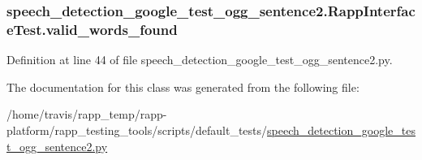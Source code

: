 \hypertarget{classspeech__detection__google__test__ogg__sentence2_1_1RappInterfaceTest_afa9a6449293346d27b73fc6e379cc70e}{
\subsubsection[{valid\-\_\-words\-\_\-found}]{\setlength{\rightskip}{0pt plus 5cm}speech\-\_\-detection\-\_\-google\-\_\-test\-\_\-ogg\-\_\-sentence2.\-Rapp\-Interface\-Test.\-valid\-\_\-words\-\_\-found}}\label{classspeech__detection__google__test__ogg__sentence2_1_1RappInterfaceTest_afa9a6449293346d27b73fc6e379cc70e}


Definition at line 44 of file speech\-\_\-detection\-\_\-google\-\_\-test\-\_\-ogg\-\_\-sentence2.\-py.



The documentation for this class was generated from the following file\-:\begin{DoxyCompactItemize}
\item 
/home/travis/rapp\-\_\-temp/rapp-\/platform/rapp\-\_\-testing\-\_\-tools/scripts/default\-\_\-tests/\hyperlink{speech__detection__google__test__ogg__sentence2_8py}{speech\-\_\-detection\-\_\-google\-\_\-test\-\_\-ogg\-\_\-sentence2.\-py}\end{DoxyCompactItemize}
